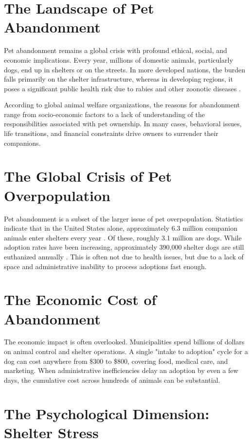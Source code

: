 \section{The Landscape of Pet Abandonment}

Pet abandonment remains a global crisis with profound ethical, social, and economic implications. Every year, millions of domestic animals, particularly dogs, end up in shelters or on the streets. In more developed nations, the burden falls primarily on the shelter infrastructure, whereas in developing regions, it poses a significant public health risk due to rabies and other zoonotic diseases \cite{who_rabies}.

According to global animal welfare organizations, the reasons for abandonment range from socio-economic factors to a lack of understanding of the responsibilities associated with pet ownership. In many cases, behavioral issues, life transitions, and financial constraints drive owners to surrender their companions.

\section{The Global Crisis of Pet Overpopulation}

Pet abandonment is a subset of the larger issue of pet overpopulation. Statistics indicate that in the United States alone, approximately 6.3 million companion animals enter shelters every year \cite{aspca_stats}. Of these, roughly 3.1 million are dogs. While adoption rates have been increasing, approximately 390,000 shelter dogs are still euthanized annually \cite{aspca_stats}. This is often not due to health issues, but due to a lack of space and administrative inability to process adoptions fast enough.

\section{The Economic Cost of Abandonment}

The economic impact is often overlooked. Municipalities spend billions of dollars on animal control and shelter operations. A single "intake to adoption" cycle for a dog can cost anywhere from \$300 to \$800, covering food, medical care, and marketing. When administrative inefficiencies delay an adoption by even a few days, the cumulative cost across hundreds of animals can be substantial.

\section{The Psychological Dimension: Shelter Stress}

